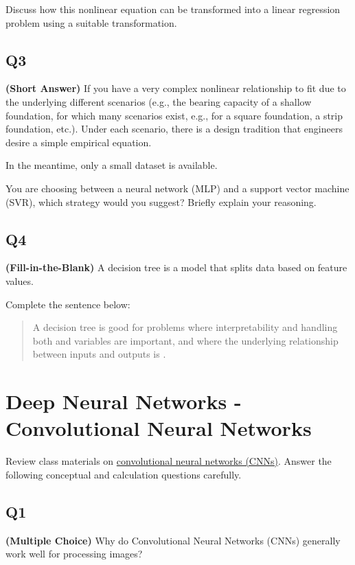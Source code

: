 \documentclass[12pt]{article}
\begin{document}
Discuss how this nonlinear equation can be transformed into a linear regression problem using a suitable transformation.

\vspace{1em}
\subsection*{Q3}
\textbf{(Short Answer)} If you have a very complex nonlinear relationship to fit due to the underlying different scenarios (e.g., the bearing capacity of a shallow foundation, for which many scenarios exist, e.g., for a square foundation, a strip foundation, etc.). Under each scenario, there is a design tradition that engineers desire a simple empirical equation. 


In the meantime, only a small dataset is available.

You are choosing between a neural network (MLP) and a support vector machine (SVR), which strategy would you suggest? Briefly explain your reasoning.

\vspace{1em}
\subsection*{Q4}
\textbf{(Fill-in-the-Blank)} A decision tree is a model that splits data based on feature values.

Complete the sentence below:

\begin{quote}
A decision tree is good for problems where interpretability and handling both \underline{\hspace{2cm}} and \underline{\hspace{2cm}} variables are important, and where the underlying relationship between inputs and outputs is \underline{\hspace{2cm}}.
\end{quote}


\newpage
\section*{Deep Neural Networks - Convolutional Neural Networks}


Review class materials on \href{https://umsystem.instructure.com/courses/280496/files/34117289?module_item_id=9971136}{convolutional neural networks (CNNs)}. Answer the following conceptual and calculation questions carefully.


\subsection*{Q1}
\textbf{(Multiple Choice)} Why do Convolutional Neural Networks (CNNs) generally work well for processing images?
\end{document}
